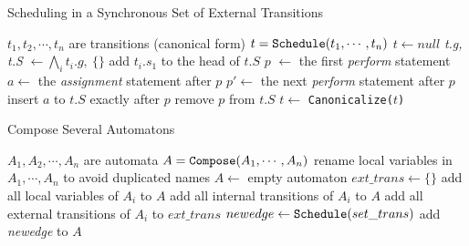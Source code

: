 \begin{algorithm}[H]
    \caption{Scheduling in a Synchronous Set of External Transitions}
    \label{alg:synchronize}
    \begin{algorithmic}[1]
        \REQUIRE $t_1,t_2,\cdots,t_n$ are transitions (canonical form)
        \ENSURE $t=\mbox{\texttt{Schedule}}(t_1,\cdots,t_n)$
            \STATE $t\leftarrow null$
            \RETURN
        \ENDIF
        \STATE \emph{t.g, t.S} $\leftarrow \bigwedge_i t_i.g,\:\{\}$
            \STATE add $t_i.s_1$ to the head of $t.S$
            \ENDIF
            \STATE $p$ $\leftarrow$ the first \emph{perform} statement
                \STATE $a\leftarrow$ the \emph{assignment} statement after $p$
                \STATE $p'\leftarrow$ the next \emph{perform} statement after $p$
                    \STATE insert $a$ to $t.S$ exactly after $p$
                    \STATE remove $p$ from $t.S$
                \ENDIF
            \ENDWHILE
        \ENDFOR
        \STATE $t\leftarrow$ \texttt{Canonicalize($t$)}
    \end{algorithmic}
\end{algorithm}

\begin{algorithm}[H]
    \caption{Compose Several Automatons}
    \label{alg:compose}
    \begin{algorithmic}[1]
        \REQUIRE $A_1,A_2,\cdots,A_n$ are automata
        \ENSURE $A=\mbox{\texttt{Compose}}(A_1,\cdots,A_n)$
        \STATE rename local variables in $A_1,\cdots,A_n$ to avoid duplicated names
        \STATE $A \leftarrow $ empty automaton
        \STATE $ext\_trans\leftarrow \{\}$
            \STATE add all local variables of $A_i$ to $A$
            \STATE add all internal transitions of $A_i$ to $A$
            \STATE add all external transitions of $A_i$ to $ext\_trans$
        \ENDFOR
            \STATE $newedge\leftarrow \mbox{\texttt{Schedule}}(set\_trans)$ 
                \STATE add \emph{newedge} to $A$
            \ENDIF
        \ENDFOR
    \end{algorithmic}
\end{algorithm}

